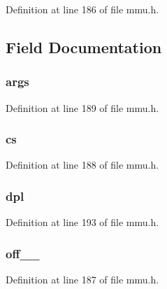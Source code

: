 Definition at line 186 of file mmu.\-h.



\subsection{Field Documentation}
\hypertarget{structgatedesc_a69a56280915744f111d56afba8b9bbe5}{
\subsubsection[{args}]{ args}}\label{structgatedesc_a69a56280915744f111d56afba8b9bbe5}


Definition at line 189 of file mmu.\-h.

\hypertarget{structgatedesc_a21ff1dca4ee9146feae362cb81bdb73b}{
\subsubsection[{cs}]{ cs}}\label{structgatedesc_a21ff1dca4ee9146feae362cb81bdb73b}


Definition at line 188 of file mmu.\-h.

\hypertarget{structgatedesc_af007c16108fee6bd537fac7128283b6e}{
\subsubsection[{dpl}]{ dpl}}\label{structgatedesc_af007c16108fee6bd537fac7128283b6e}


Definition at line 193 of file mmu.\-h.

\hypertarget{structgatedesc_a0bf2673f8a3b3345556cc583c08bfcbf}{
\subsubsection[{off\-\_\-15\-\_\-0}]{ off\-\_\-\_}}\label{structgatedesc_a0bf2673f8a3b3345556cc583c08bfcbf}


Definition at line 187 of file mmu.\-h.

